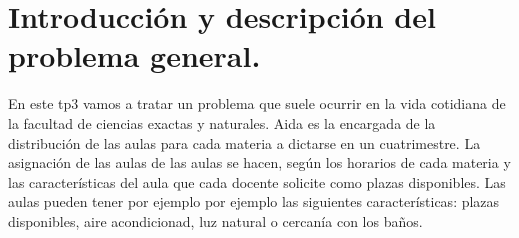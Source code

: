 \documentclass[a4paper]{article}
\begin{document}

\thispagestyle{empty}

\maketitle
\newpage

\thispagestyle{empty}

\thispagestyle{empty}
\vspace{1.5cm}
\tableofcontents
\newpage


\section{Introducción y descripción del problema general.}

En este tp3 vamos a tratar un problema que suele ocurrir en la vida cotidiana de la facultad de ciencias exactas y naturales. Aida es la encargada de la distribución de las aulas para cada materia a dictarse en un cuatrimestre.
La asignación de las aulas de las aulas se hacen, según los horarios de cada materia y las características del aula que cada docente solicite  como plazas disponibles. Las aulas pueden tener por ejemplo por ejemplo las siguientes características: plazas disponibles, aire acondicionad, luz natural o cercanía con los baños.
\end{document}
